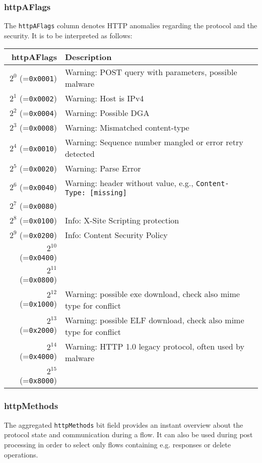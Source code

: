 \documentclass[documentation]{subfiles}
\begin{document}
\subsubsection{httpAFlags}\label{httpAFlags}
The {\tt httpAFlags} column denotes HTTP anomalies regarding the
protocol and the security. It is to be interpreted as follows:
\begin{longtable}{rl}
    \toprule
    {\bf httpAFlags} & {\bf Description}\\
    \midrule\endhead%
    $2^{0}$  (={\tt 0x0001}) & Warning: POST query with parameters, possible malware \\
    $2^{1}$  (={\tt 0x0002}) & Warning: Host is IPv4\\
    $2^{2}$  (={\tt 0x0004}) & Warning: Possible DGA\\
    $2^{3}$  (={\tt 0x0008}) & Warning: Mismatched content-type\\
    $2^{4}$  (={\tt 0x0010}) & Warning: Sequence number mangled or error retry detected\\
    $2^{5}$  (={\tt 0x0020}) & Warning: Parse Error\\
    $2^{6}$  (={\tt 0x0040}) & Warning: header without value, e.g., {\tt Content-Type:\ [missing]}\\
    $2^{7}$  (={\tt 0x0080}) & \\
    $2^{8}$  (={\tt 0x0100}) & Info: X-Site Scripting protection\\
    $2^{9}$  (={\tt 0x0200}) & Info: Content Security Policy\\
    $2^{10}$ (={\tt 0x0400}) & \\
    $2^{11}$ (={\tt 0x0800}) & \\
    $2^{12}$ (={\tt 0x1000}) & Warning: possible exe download, check also mime type for conflict\\
    $2^{13}$ (={\tt 0x2000}) & Warning: possible ELF download, check also mime type for conflict\\
    $2^{14}$ (={\tt 0x4000}) & Warning: HTTP 1.0 legacy protocol, often used by malware\\
    $2^{15}$ (={\tt 0x8000}) & \\
    \bottomrule
\end{longtable}

\subsubsection{httpMethods}\label{httpMethods}
The aggregated {\tt httpMethods} bit field provides an instant overview
about the protocol state and communication during a flow. It can also be used
during post processing in order to select only flows containing e.g. responses
or delete operations.
\end{document}
